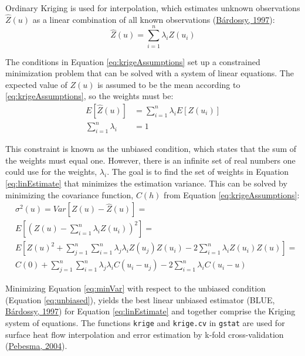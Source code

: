 Ordinary Kriging is used for interpolation, which estimates unknown observations \(\hat{Z}(u)\) as a linear combination of all known observations (\protect\hyperlink{ref-bardossy1997}{Bárdossy, 1997}):
\begin{equation}
  \hat{Z}(u) = \sum_{i=1}^n \lambda_i Z(u_i)
  \label{eq:linEstimate}
\end{equation}

The conditions in Equation \eqref{eq:krigeAssumptions} set up a constrained minimization problem that can be solved with a system of linear equations. The expected value of \(Z(u)\) is assumed to be the mean according to \eqref{eq:krigeAssumptions}, so the weights must be:
\begin{equation}
  \begin{aligned}
    E[\hat{Z}(u)] &= \sum_{i=1}^n \lambda_i E[Z(u_i)] \\
    \sum_{i=1}^n \lambda_i &= 1
  \end{aligned}
  \label{eq:unbiased}
\end{equation}

This constraint is known as the unbiased condition, which states that the sum of the weights must equal one. However, there is an infinite set of real numbers one could use for the weights, \(\lambda_i\). The goal is to find the set of weights in Equation \eqref{eq:linEstimate} that minimizes the estimation variance. This can be solved by minimizing the covariance function, \(C(h)\) from Equation \eqref{eq:krigeAssumptions}:
\begin{equation}
  \begin{aligned}
    & \sigma^2(u) = Var[Z(u) - \hat{Z}(u)] = \\
    & E\left[(Z(u) - \sum_{i=1}^n \lambda_i Z(u_i))^2\right] = \\
    & E\left[Z(u)^2 + \sum_{j=1}^n \sum_{i=1}^n \lambda_j \lambda_i Z(u_j)Z(u_i) - 2 \sum_{i=1}^n \lambda_i Z(u_i)Z(u)\right] = \\
    & C(0) + \sum_{j=1}^n \sum_{i=1}^n \lambda_j \lambda_i C(u_i - u_j) - 2 \sum_{i=1}^n \lambda_i C(u_i - u)
  \end{aligned}
  \label{eq:minVar}
\end{equation}

Minimizing Equation \eqref{eq:minVar} with respect to the unbiased condition (Equation \eqref{eq:unbiased}), yields the best linear unbiased estimator (BLUE, \protect\hyperlink{ref-bardossy1997}{Bárdossy, 1997}) for Equation \eqref{eq:linEstimate} and together comprise the Kriging system of equations. The functions \texttt{krige} and \texttt{krige.cv} in \texttt{gstat} are used for surface heat flow interpolation and error estimation by k-fold cross-validation (\protect\hyperlink{ref-pebesma2004}{Pebesma, 2004}).

